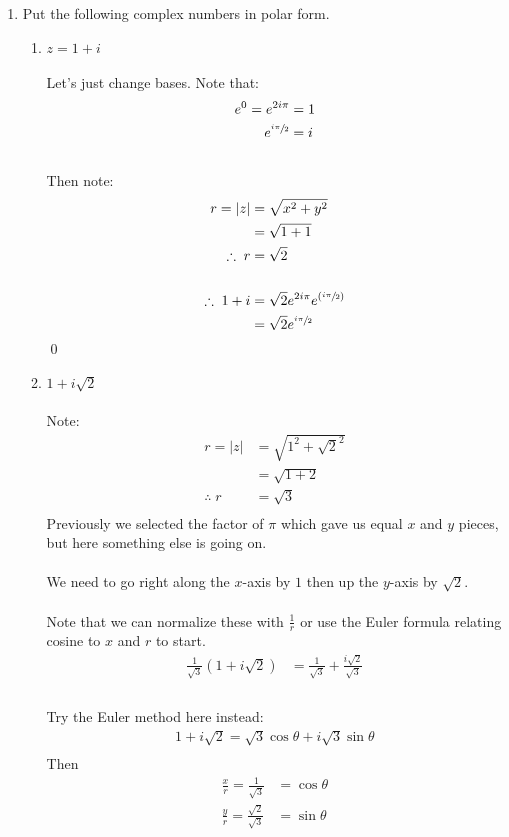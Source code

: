 \begin{enumerate}


	\item Put the following complex numbers in polar form.
	\begin{enumerate}
		
		
		\item $z = 1 + i$ \\
		\\ 
		Let's just change bases. Note that:
		\begin{align*}
			e^0 = e^{2i\pi} &= 1 \\
			e^{\sfrac{i\pi}{2}} &= i\\
		\end{align*} 
		\\
		Then note:
		\begin{align*}
			r = |z| &= \sqrt{x^2 + y^2} \\ 
			&= \sqrt{1 + 1} \\ 
			\therefore \; r &= \sqrt{2} \\
			\\
			\therefore \; 1 + i &= \sqrt{2} e^{2i\pi} e^{(\sfrac{i\pi}{2})} \\
			&= \sqrt{2}e^{\sfrac{i\pi}{2}}
		\end{align*}
		\qed
		
		\item $1 + i\sqrt{2}$ \\
		\\
		Note:
		\begin{align*}
			r = |z| &= \sqrt{1^2 + \sqrt{2}^2} \\
			&= \sqrt{1 + 2} \\
			\therefore \; r &= \sqrt{3}\\
		\end{align*}
		Previously we selected the factor of $\pi$ which gave us equal $x$ and $y$ pieces, but here something else is going on. \\
		\\
		We need to go right along the $x$-axis by $1$ then up the $y$-axis by $\sqrt{2}.$ \\
		\\
		Note that we can normalize these with $\frac{1}{r}$ or use the Euler formula relating cosine to $x$ and $r$ to start. \\
		
		\begin{align*}
			\frac{1}{\sqrt{3}}(1 + i\sqrt{2}) &= \frac{1}{\sqrt{3}} + \frac{i\sqrt{2}}{\sqrt{3}} \\
		\end{align*}
		\\
		Try the Euler method here instead:
		\begin{align*}
			1 + i\sqrt{2} = \sqrt{3}\cos\theta + i\sqrt{3}\sin\theta \\
		\end{align*}
		Then
		\begin{align*}
			\frac{x}{r} = \frac{1}{\sqrt{3}} &= \cos\theta \\
			\frac{y}{r} = \frac{\sqrt{2}}{\sqrt{3}} &= \sin\theta \\
		\end{align*}
		


\end{enumerate}
\end{enumerate}
